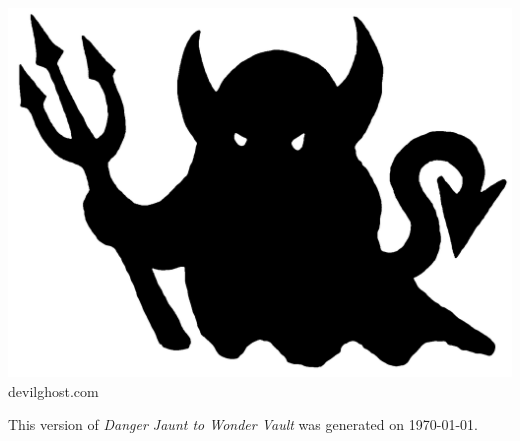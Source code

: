 \documentclass[fontsize=9pt,twoside]{scrreprt}
\newcommand{\blankpage}{
    \newpage
    \thispagestyle{empty}
    \mbox{}
    \newpage
}
\begin{document}
\begin{titlepage}
\begin{center}
    \vspace{3ex}
	\includegraphics[scale=.125]{img/devilghost.png} \\
	\footnotesize devilghost.com
    \end{center}
\end{titlepage}
\clearpage

\blankpage

\renewcommand\thepage{}
\thispagestyle{empty}
{\small \tableofcontents}
\clearpage
\renewcommand\thepage{\arabic{page}}



\vfill
\centering
\noindent \footnotesize This version of \textit{Danger Jaunt to Wonder Vault} was generated on \today.
\end{document}
